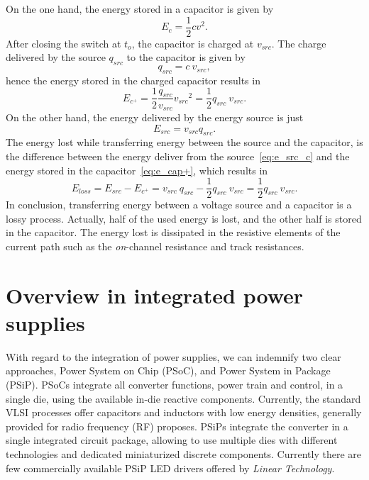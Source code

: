 On the one hand, the energy stored in a capacitor is given by
\begin{equation}
E_c = \frac{1}{2} c v^2.
\label{eq:e_cap}
\end{equation}
After closing the switch at $t_o$, the capacitor is charged at $v_{src}$.  The charge delivered by the source $q_{src}$ to the capacitor is given by
\begin{equation}
q_{src}= c~v_{src},
\label{eq:q_src_cap}
\end{equation}
hence the energy stored in the charged capacitor results in
\begin{equation}
E_{c^+} = \frac{1}{2} \frac{q_{src}}{v_{src}}  {v_{src}}^2 = \frac{1}{2}q_{src}~v_{src}.
\label{eq:e_cap+}
\end{equation}
On the other hand, the energy delivered by the energy source is just
\begin{equation}
E_{src} = v_{src} q_{src}.
\label{eq:e_src_c}
\end{equation}
The energy lost while transferring energy between the source and the capacitor, is the difference between the energy deliver from the source~\eqref{eq:e_src_c} and the energy stored in the capacitor~\eqref{eq:e_cap+}, which results in
\begin{equation}
E_{loss} = E_{src} - E_{c^+} = v_{src}~q_{src}  - \frac{1}{2}q_{src}~v_{src}  = \frac{1}{2}q_{src}~v_{src}.
\label{eq:e_loss_l}
\end{equation}
In conclusion, transferring energy between a voltage source and a capacitor is a lossy process. Actually, half of the used energy is lost, and the other half is stored in the capacitor. The energy lost is dissipated in the resistive elements of the current path such as the \emph{on}-channel resistance and track resistances.









\section{Overview in integrated power supplies}
With regard to the integration of power supplies, we can indemnify two clear approaches, Power System on Chip (PSoC), and  Power System in Package (PSiP). PSoCs integrate all converter functions, power train and control, in a single die, using the available in-die reactive components. Currently, the standard VLSI processes offer capacitors and inductors with low energy densities, generally provided for radio frequency (RF) proposes. PSiPs integrate the converter in a single integrated circuit package, allowing to use multiple dies with different technologies and dedicated miniaturized discrete components. Currently there are few commercially available PSiP LED drivers offered by \emph{Linear Technology}.

